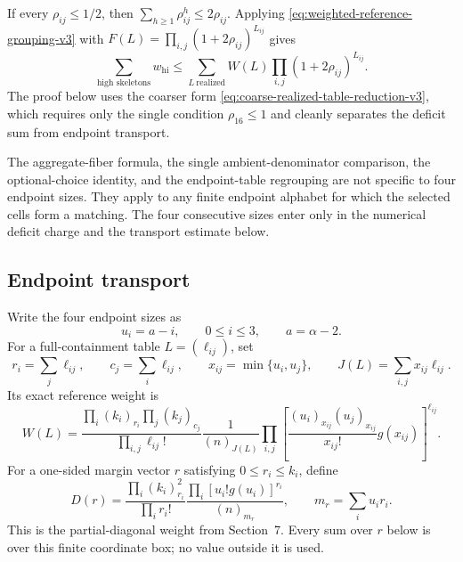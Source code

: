 \begin{remark}
If every $\rho_{ij}\le1/2$, then
$\sum_{h\ge1}\rho_{ij}^h\le2\rho_{ij}$. Applying
\eqref{eq:weighted-reference-grouping-v3} with
$F(L)=\prod_{i,j}(1+2\rho_{ij})^{L_{ij}}$ gives
\[
  \sum_{\text{high skeletons}}w_{\mathrm{hi}}
  \le
  \sum_{L\ \mathrm{realized}}
    W(L)\prod_{i,j}(1+2\rho_{ij})^{L_{ij}}.
\]
The proof below uses the coarser form
\eqref{eq:coarse-realized-table-reduction-v3}, which requires only the single
condition $\rho_{16}\le1$ and cleanly separates the deficit sum from endpoint
transport.
\end{remark}

\begin{remark}
The aggregate-fiber formula, the single ambient-denominator comparison, the
optional-choice identity, and the endpoint-table regrouping are not specific
to four endpoint sizes. They apply to any finite endpoint alphabet for which
the selected cells form a matching. The four consecutive sizes enter only in
the numerical deficit charge and the transport estimate below.
\end{remark}

\subsection{Endpoint transport}

Write the four endpoint sizes as
\[
  u_i=a-i,
  \qquad 0\le i\le3,
  \qquad a=\alpha-2.
\]
For a full-containment table $L=(\ell_{ij})$, set
\[
  r_i=\sum_j\ell_{ij},
  \qquad
  c_j=\sum_i\ell_{ij},
  \qquad
  x_{ij}=\min\{u_i,u_j\},
  \qquad
  J(L)=\sum_{i,j}x_{ij}\ell_{ij}.
\]
Its exact reference weight is
\begin{equation}
  W(L)=
  \frac{\prod_i(k_i)_{r_i}\prod_j(k_j)_{c_j}}
       {\prod_{i,j}\ell_{ij}!}
  \frac1{(n)_{J(L)}}
  \prod_{i,j}
  \left[
    \frac{(u_i)_{x_{ij}}(u_j)_{x_{ij}}}{x_{ij}!}g(x_{ij})
  \right]^{\ell_{ij}}.
  \label{eq:endpoint-reference-weight-v3}
\end{equation}
For a one-sided margin vector $r$ satisfying $0\le r_i\le k_i$, define
\begin{equation}
  D(r)=
  \frac{\prod_i(k_i)_{r_i}^2}{\prod_i r_i!}
  \frac{\prod_i[u_i!g(u_i)]^{r_i}}{(n)_{m_r}},
  \qquad
  m_r=\sum_i u_ir_i.
  \label{eq:one-sided-diagonal-weight-v3}
\end{equation}
This is the partial-diagonal weight from Section~7. Every sum over $r$ below is
over this finite coordinate box; no value outside it is used.

